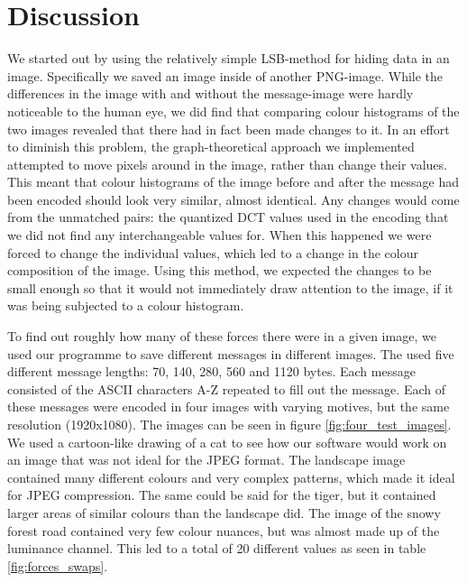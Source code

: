 \section{Discussion}
We started out by using the relatively simple LSB-method for hiding data in an image.
Specifically we saved an image inside of another PNG-image.
While the differences in the image with and without the message-image were hardly noticeable to the human eye, we did find that comparing colour histograms of the two images revealed that there had in fact been made changes to it.
In an effort to diminish this problem, the graph-theoretical approach we implemented attempted to move pixels around in the image, rather than change their values.
This meant that colour histograms of the image before and after the message had been encoded should look very similar, almost identical.
Any changes would come from the unmatched pairs: the quantized DCT values used in the encoding that we did not find any interchangeable values for.
When this happened we were forced to change the individual values, which led to a change in the colour composition of the image.
Using this method, we expected the changes to be small enough so that it would not immediately draw attention to the image, if it was being subjected to a colour histogram.

To find out roughly how many of these forces there were in a given image, we used our programme to save different messages in different images.
The used five different message lengths: 70, 140, 280, 560 and 1120 bytes.
Each message consisted of the ASCII characters A-Z repeated to fill out the message.
Each of these messages were encoded in four images with varying motives, but the same resolution (1920x1080).
The images can be seen in figure \ref{fig:four_test_images}.
We used a cartoon-like drawing of a cat to see how our software would work on an image that was not ideal for the JPEG format.
The landscape image contained many different colours and very complex patterns, which made it ideal for JPEG compression.
The same could be said for the tiger, but it contained larger areas of similar colours than the landscape did.
The image of the snowy forest road contained very few colour nuances, but was almost made up of the luminance channel.
This led to a total of 20 different values as seen in table \ref{fig:forces_swaps}.

